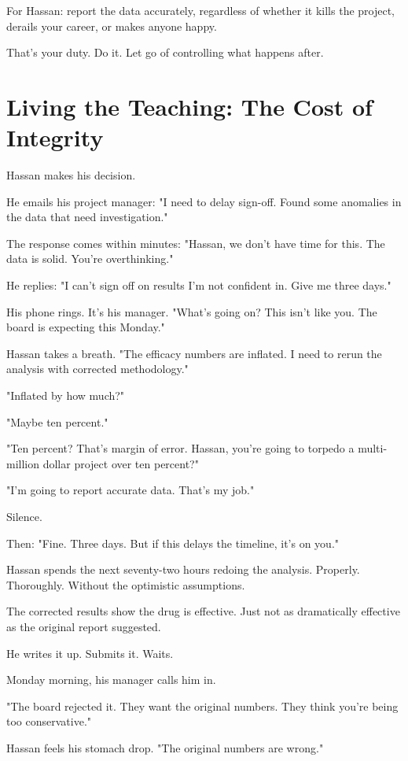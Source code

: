 \documentclass[11pt,twoside]{book}
\begin{document}
For Hassan: report the data accurately, regardless of whether it kills the project, derails your career, or makes anyone happy.

That's your duty. Do it. Let go of controlling what happens after.

\section*{Living the Teaching: The Cost of Integrity}

Hassan makes his decision.

He emails his project manager: "I need to delay sign-off. Found some anomalies in the data that need investigation."

The response comes within minutes: "Hassan, we don't have time for this. The data is solid. You're overthinking."

He replies: "I can't sign off on results I'm not confident in. Give me three days."

His phone rings. It's his manager. "What's going on? This isn't like you. The board is expecting this Monday."

Hassan takes a breath. "The efficacy numbers are inflated. I need to rerun the analysis with corrected methodology."

"Inflated by how much?"

"Maybe ten percent."

"Ten percent? That's margin of error. Hassan, you're going to torpedo a multi-million dollar project over ten percent?"

"I'm going to report accurate data. That's my job."

Silence.

Then: "Fine. Three days. But if this delays the timeline, it's on you."

Hassan spends the next seventy-two hours redoing the analysis. Properly. Thoroughly. Without the optimistic assumptions.

The corrected results show the drug is effective. Just not as dramatically effective as the original report suggested.

He writes it up. Submits it. Waits.

Monday morning, his manager calls him in.

"The board rejected it. They want the original numbers. They think you're being too conservative."

Hassan feels his stomach drop. "The original numbers are wrong."
\end{document}
